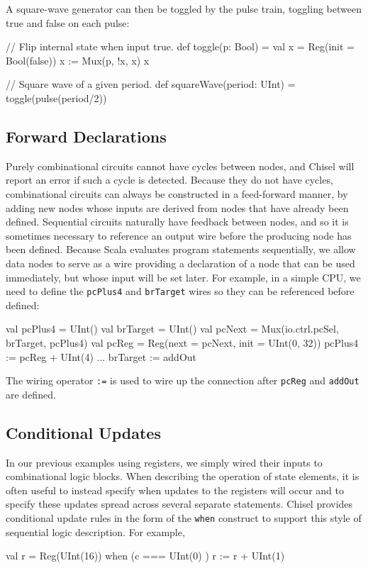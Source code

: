 \documentclass[twocolumn,10pt]{article}
\def\code#1{{\tt #1}}
\begin{document}
\noindent
A square-wave generator can then be toggled by the pulse train,
toggling between true and false on each pulse:
\begin{scala}
// Flip internal state when input true.
def toggle(p: Bool) = {
  val x = Reg(init = Bool(false))
  x := Mux(p, !x, x)
  x
}

// Square wave of a given period.
def squareWave(period: UInt) = toggle(pulse(period/2))
\end{scala}

\subsection{Forward Declarations}

Purely combinational circuits cannot have cycles between nodes, and
Chisel will report an error if such a cycle is detected.  Because they
do not have cycles, combinational circuits can always be constructed
in a feed-forward manner, by adding new nodes whose inputs are derived
from nodes that have already been defined.  Sequential circuits
naturally have feedback between nodes, and so it is sometimes
necessary to reference an output wire before the producing node has
been defined.  Because Scala evaluates program statements
sequentially, we allow data nodes to serve as a wire providing
a declaration of a node that can be used immediately, but whose
input will be set later.  
For example, in a simple CPU, we need to define the \verb!pcPlus4!
and \verb!brTarget! wires so they can be referenced before defined:
\begin{scala}
val pcPlus4  = UInt()
val brTarget = UInt()
val pcNext   = Mux(io.ctrl.pcSel, brTarget, pcPlus4)
val pcReg    = Reg(next = pcNext, init = UInt(0, 32))
pcPlus4     := pcReg + UInt(4)
...
brTarget    := addOut
\end{scala}

\noindent
The wiring operator
\verb!:=! is used to wire up
the connection after \verb!pcReg! and \verb!addOut! are defined.

\subsection{Conditional Updates}

In our previous examples using registers, we simply wired their inputs
to combinational logic blocks.  When describing the operation of state
elements, it is often useful to instead specify when updates to the
registers will occur and to specify these updates spread across
several separate statements.  Chisel provides conditional update rules
in the form of the \code{when} construct to support this style of
sequential logic description. For example,
\begin{scala}
val r = Reg(UInt(16))
when (c === UInt(0) ) {
  r := r + UInt(1)
}
\end{scala}
\end{document}
